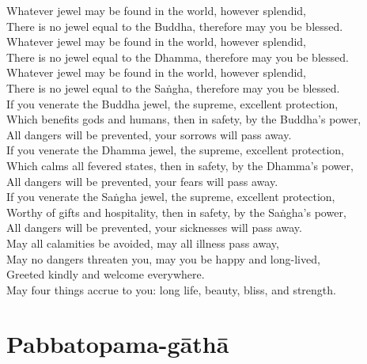 Whatever jewel may be found in the world, however splendid,\\
There is no jewel equal to the Buddha, therefore may you be blessed.\\
Whatever jewel may be found in the world, however splendid,\\
There is no jewel equal to the Dhamma, therefore may you be blessed.\\
Whatever jewel may be found in the world, however splendid,\\
There is no jewel equal to the Saṅgha, therefore may you be blessed.\\
If you venerate the Buddha jewel, the supreme, excellent protection,\\
Which benefits gods and humans, then in safety, by the Buddha's power,\\
All dangers will be prevented, your sorrows will pass away.\\
If you venerate the Dhamma jewel, the supreme, excellent protection,\\
Which calms all fevered states, then in safety, by the Dhamma's power,\\
All dangers will be prevented, your fears will pass away.\\
If you venerate the Saṅgha jewel, the supreme, excellent protection,\\
Worthy of gifts and hospitality, then in safety, by the Saṅgha's power,\\
All dangers will be prevented, your sicknesses will pass away.\\
May all calamities be avoided, may all illness pass away,\\
May no dangers threaten you, may you be happy and long-lived,\\
Greeted kindly and welcome everywhere.\\
May four things accrue to you: long life, beauty, bliss, and strength.

\section{Pabbatopama-gāthā}


